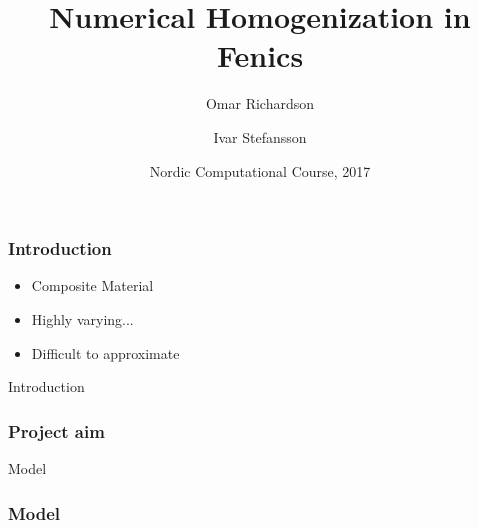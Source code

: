 \documentclass{beamer}
\title[Numerical homogenization]{Numerical Homogenization in Fenics}
\author[O. Richardson \and I. Stefansson] %
{Omar Richardson \and Ivar Stefansson}
\institute %
{
    Karlstad University, Sweden \and University of Bergen, Norway
}
\date[]{Nordic Computational Course, 2017}
\begin{document}
  \frame{\titlepage}
\begin{frame}
  \frametitle{Introduction}
  \begin{itemize}
    \item Composite Material
    \item Highly varying...
    \item Difficult to approximate
  \end{itemize}
\end{frame}

\begin{frame}[t]{Introduction}
  \frametitle{Project aim}
\end{frame}

\begin{frame}[t]{Model}
  \frametitle{Model}
\end{frame}
\end{document}
